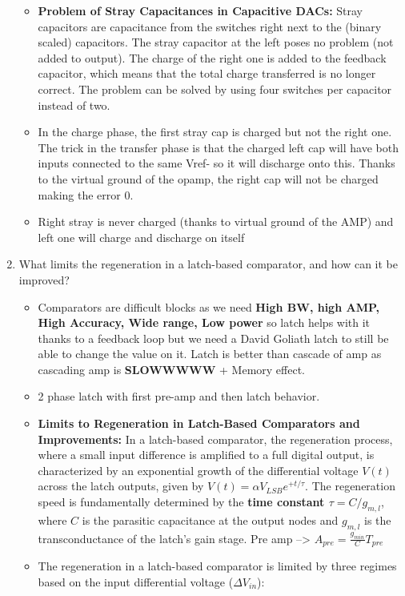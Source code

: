 \documentclass[
  a4paper,
]{article}
\providecommand{\tightlist}{%
  \setlength{\itemsep}{0pt}\setlength{\parskip}{0pt}}
\begin{document}
\begin{enumerate}
  \begin{itemize}
  \tightlist
  \item
    \textbf{Problem of Stray Capacitances in Capacitive DACs:} Stray
    capacitors are capacitance from the switches right next to the
    (binary scaled) capacitors. The stray capacitor at the left poses no
    problem (not added to output). The charge of the right one is added
    to the feedback capacitor, which means that the total charge
    transferred is no longer correct. The problem can be solved by using
    four switches per capacitor instead of two.
  \item
    In the charge phase, the first stray cap is charged but not the
    right one. The trick in the transfer phase is that the charged left
    cap will have both inputs connected to the same Vref- so it will
    discharge onto this. Thanks to the virtual ground of the opamp, the
    right cap will not be charged making the error 0.
  \item
    Right stray is never charged (thanks to virtual ground of the AMP)
    and left one will charge and discharge on itself
  \end{itemize}
\item
  What limits the regeneration in a latch-based comparator, and how can
  it be improved?

  \begin{itemize}
  \item
    Comparators are difficult blocks as we need \textbf{High BW, high
    AMP, High Accuracy, Wide range, Low power} so latch helps with it
    thanks to a feedback loop but we need a David Goliath latch to still
    be able to change the value on it. Latch is better than cascade of
    amp as cascading amp is \textbf{SLOWWWWW} + Memory effect.
  \item
    2 phase latch with first pre-amp and then latch behavior.
  \item
    \textbf{Limits to Regeneration in Latch-Based Comparators and
    Improvements:} In a latch-based comparator, the regeneration
    process, where a small input difference is amplified to a full
    digital output, is characterized by an exponential growth of the
    differential voltage \(V(t)\) across the latch outputs, given by
    \(V(t) = \alpha V_{LSB} e^{+t/\tau}\). The regeneration speed is
    fundamentally determined by the \textbf{time constant
    \(\tau = C/g_{m,l}\)}, where \(C\) is the parasitic capacitance at
    the output nodes and \(g_{m,l}\) is the transconductance of the
    latch's gain stage. Pre amp --\textgreater{}
    \(A_{pre} = \frac{g_{min}}{C} T_{pre}\)
  \item
    The regeneration in a latch-based comparator is limited by three
    regimes based on the input differential voltage (\(\Delta V_{in}\)):


\end{itemize}
\end{enumerate}
\end{document}
